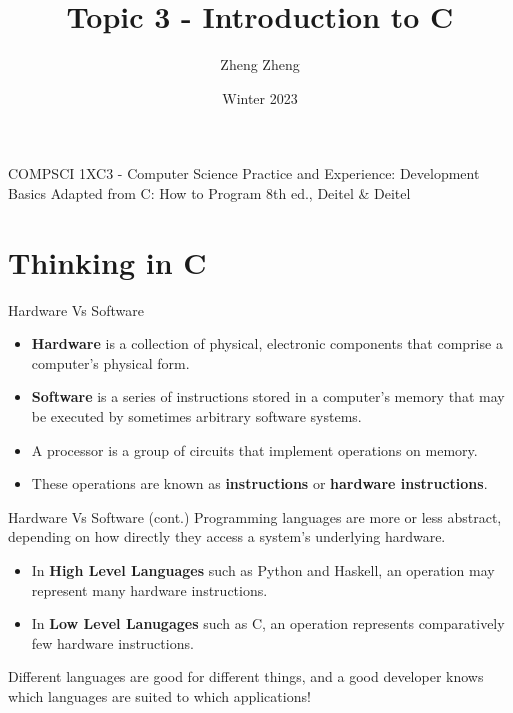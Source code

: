 \documentclass[11pt]{beamer}
\author{Zheng Zheng}
\title{Topic 3 - Introduction to C}
\institute{McMaster University}
\date{Winter 2023}
\begin{document}
\begin{frame}
\center
COMPSCI 1XC3 - Computer Science Practice and Experience:
Development Basics
\titlepage
Adapted from C: How to Program 8th ed., Deitel \& Deitel
\end{frame}

\begin{frame}
\tableofcontents
\end{frame}

\section[Intro]{Thinking in C}
\begin{frame}{Hardware Vs Software}
\begin{itemize}
\item \textbf{Hardware} is a collection of physical, electronic components that comprise a computer's physical form.
\item \textbf{Software} is a series of instructions stored in a computer's memory that may be executed by sometimes arbitrary software systems.  
\item A processor is a group of circuits that implement operations on memory.
\item These operations are known as \textbf{instructions} or \textbf{hardware instructions}.
\end{itemize}
\end{frame}

\begin{frame}{Hardware Vs Software (cont.)}
Programming languages are more or less abstract, depending on how directly they access a system's underlying hardware.  
\begin{itemize}
\item In \textbf{High Level Languages} such as Python and Haskell, an operation may represent many hardware instructions.
\item In \textbf{Low Level Lanugages} such as C, an operation represents comparatively few hardware instructions.  
\end{itemize}
Different languages are good for different things, and a good developer knows which languages are suited to which applications! 
\end{frame}
\end{document}
